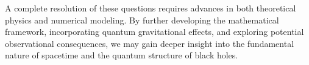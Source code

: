 A complete resolution of these questions requires advances in both theoretical physics and numerical modeling. By further developing the mathematical framework, incorporating quantum gravitational effects, and exploring potential observational consequences, we may gain deeper insight into the fundamental nature of spacetime and the quantum structure of black holes.

